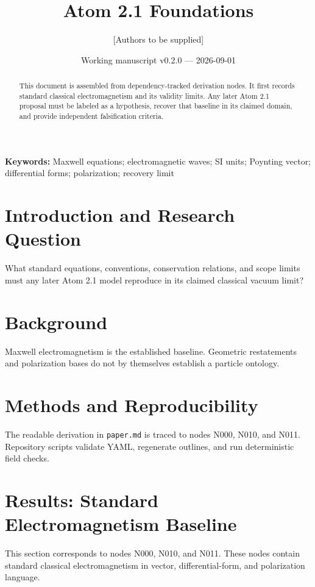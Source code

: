 \documentclass[11pt]{article}
\title{Atom 2.1 Foundations}
\author{[Authors to be supplied]\\[Affiliations to be supplied]}
\date{Working manuscript v0.2.0 --- 2026-09-01}
\begin{document}
\maketitle

\begin{abstract}
This document is assembled from dependency-tracked derivation nodes. It first records
standard classical electromagnetism and its validity limits. Any later Atom 2.1 proposal
must be labeled as a hypothesis, recover that baseline in its claimed domain, and provide
independent falsification criteria.
\end{abstract}

\noindent\textbf{Keywords:} Maxwell equations; electromagnetic waves; SI units;
Poynting vector; differential forms; polarization; recovery limit

\section{Introduction and Research Question}
What standard equations, conventions, conservation relations, and scope limits must
any later Atom 2.1 model reproduce in its claimed classical vacuum limit?

\section{Background}
Maxwell electromagnetism is the established baseline. Geometric restatements and
polarization bases do not by themselves establish a particle ontology.

\section{Methods and Reproducibility}
The readable derivation in \texttt{paper.md} is traced to nodes N000, N010, and N011.
Repository scripts validate YAML, regenerate outlines, and run deterministic field checks.

\section{Results: Standard Electromagnetism Baseline}
This section corresponds to nodes N000, N010, and N011. These nodes contain standard
classical electromagnetism in vector, differential-form, and polarization language.

% 
\end{document}
